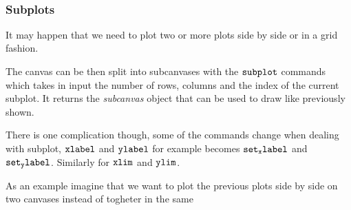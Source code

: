     \begin{center}
    \end{center}
    { \hspace*{\fill} \\}
    
    \hypertarget{subplots}{%
\subsubsection{Subplots}\label{subplots}}

It may happen that we need to plot two or more plots side by side or in
a grid fashion.

The canvas can be then split into subcanvases with the \(\tt{subplot}\)
commands which takes in input the number of rows, columns and the index
of the current subplot. It returns the \emph{subcanvas} object that can
be used to draw like previously shown.

There is one complication though, some of the commands change when
dealing with subplot, \(\tt{xlabel}\) and \(\tt{ylabel}\) for example
becomes \(\tt{set_xlabel}\) and \(\tt{set_ylabel}\). Similarly for
\(\tt{xlim}\) and \(\tt{ylim}\).

As an example imagine that we want to plot the previous plots side by
side on two canvases instead of togheter in the same

